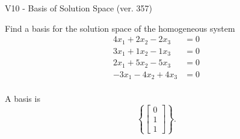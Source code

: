 \begin{exercise}
  \begin{exerciseTitle}V10 - Basis of Solution Space (ver. 357)\end{exerciseTitle}
  \begin{exerciseStatement}
    Find a basis for the solution space of the homogeneous system 
\begin{align*}
 4 x_ 1 + 2 x_ 2 -2 x_ 3 &= 0  \\ 
  3 x_ 1 + 1 x_ 2 -1 x_ 3 &= 0  \\ 
  2 x_ 1 + 5 x_ 2 -5 x_ 3 &= 0  \\ 
  -3 x_ 1 -4 x_ 2 + 4 x_ 3 &= 0  \\ 
 \end{align*}


 
  \end{exerciseStatement}

  \begin{exerciseAnswer}
   A basis is   
\[\left\{\left[\begin{array}{c}
0 \\
1 \\
1
\end{array}\right]\right\}.\]

  


  \end{exerciseAnswer}
\end{exercise}